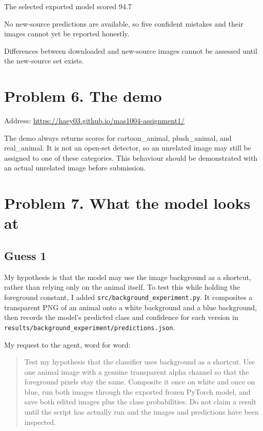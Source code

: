\documentclass[11pt]{article}
\begin{document}
The selected exported model scored 94.7%

No new-source predictions are available, so five confident mistakes and their images cannot yet be reported honestly.

Differences between downloaded and new-source images cannot be assessed until the new-source set exists.

\section*{Problem 6. The demo}

Address: \url{https://haey03.github.io/mas1004-assignment1/}

The demo always returns scores for cartoon_animal, plush_animal, and real_animal. It is not an open-set detector, so an unrelated image may still be assigned to one of these categories. This behaviour should be demonstrated with an actual unrelated image before submission.

\section*{Problem 7. What the model looks at}

\subsection*{Guess 1}

My hypothesis is that the model may use the image background as a shortcut, rather than relying only on the animal itself. To test this while holding the foreground constant, I added \texttt{src/background\_experiment.py}. It composites a transparent PNG of an animal onto a white background and a blue background, then records the model's predicted class and confidence for each version in \texttt{results/background\_experiment/predictions.json}.

My request to the agent, word for word:
\begin{quote}
Test my hypothesis that the classifier uses background as a shortcut. Use one animal image with a genuine transparent alpha channel so that the foreground pixels stay the same. Composite it once on white and once on blue, run both images through the exported frozen PyTorch model, and save both edited images plus the class probabilities. Do not claim a result until the script has actually run and the images and predictions have been inspected.
\end{quote}
\end{document}
